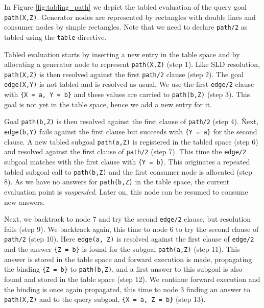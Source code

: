 In Figure \ref{fig:tabling_path} we depict the tabled evaluation of the query goal \texttt{path(X,Z)}.
Generator nodes are represented by rectangles with double lines and consumer nodes by simple rectangles.
Note that we need to declare \texttt{path/2} as tabled using the \texttt{table} directive.

Tabled evaluation starts by inserting a new entry in the table space and by allocating a generator
node to represent \texttt{path(X,Z)} (step 1). Like SLD resolution, \texttt{path(X,Z)} is then resolved
against the first \texttt{path/2} clause (step 2). The goal \texttt{edge(X,Y)} is not tabled and is
resolved as usual. We use the first \texttt{edge/2} clause with \texttt{\{X~=~a,~Y~=~b\}} and these values
are carried to \texttt{path(b,Z)} (step 3). This goal is not yet in the table space, hence we add a new entry for it.

Goal \texttt{path(b,Z)} is then resolved against the first clause of \texttt{path/2} (step 4).
Ñext, \texttt{edge(b,Y)} fails against the first clause but succeeds with \texttt{\{Y~=~a\}} for
the second clause. A new tabled subgoal \texttt{path(a,Z)} is registered in the tabled space (step 6)
and resolved against the first clause of \texttt{path/2} (step 7). This time the \texttt{edge/2}
subgoal matches with the first clause with \texttt{\{Y = b\}}. This originates a repeated tabled subgoal
call to \texttt{path(b,Z)} and the first consumer node is allocated (step 8). As we have no answers for \texttt{path(b,Z)}
in the table space, the current evaluation point is \textit{suspended}. Later on, this node can be resumed to
consume new answers.

Next, we backtrack to node 7 and try the second \texttt{edge/2} clause, but resolution fails (step 9). We backtrack again, this time to
node 6 to try the second clause of \texttt{path/2} (step 10). Here \texttt{edge(a, Z)} is resolved against the
first clause of \texttt{edge/2} and the answer \texttt{\{Z~=~b\}} is found for the subgoal \texttt{path(a,Z)} (step 11).
This answer is stored in the table space and forward execution is made, propagating the binding \texttt{\{Z~=~b\}} to
\texttt{path(b,Z)}, and a first answer to this subgoal is also found and stored in the table space (step 12).
We continue forward execution and the binding is once again propagated, this time to node 3 finding an answer to
\texttt{path(X,Z)} and to the query subgoal, \texttt{\{X~=~a,~Z~=~b\}} (step 13).

